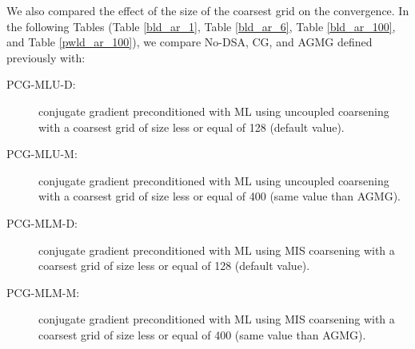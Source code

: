We also compared the effect of the size of the coarsest grid on the convergence.
In the following Tables (Table \ref{bld_ar_1}, Table \ref{bld_ar_6}, Table 
\ref{bld_ar_100}, and Table \ref{pwld_ar_100}), we 
compare No-DSA, CG, and AGMG defined previously with:
\begin{description}
  \item[PCG-MLU-D:] conjugate gradient preconditioned with ML
    using uncoupled coarsening with a coarsest grid of size less 
    or equal of 128 (default value).
  \item[PCG-MLU-M:] conjugate gradient preconditioned with ML
    using uncoupled coarsening with a coarsest grid of size less 
    or equal of 400 (same value than AGMG).
  \item[PCG-MLM-D:] conjugate gradient preconditioned with ML
    using MIS coarsening with a coarsest grid of size less or 
    equal of 128 (default value).
  \item[PCG-MLM-M:] conjugate gradient preconditioned with ML
    using MIS coarsening with a coarsest grid of size less or 
    equal of 400 (same value than AGMG).
\end{description}

